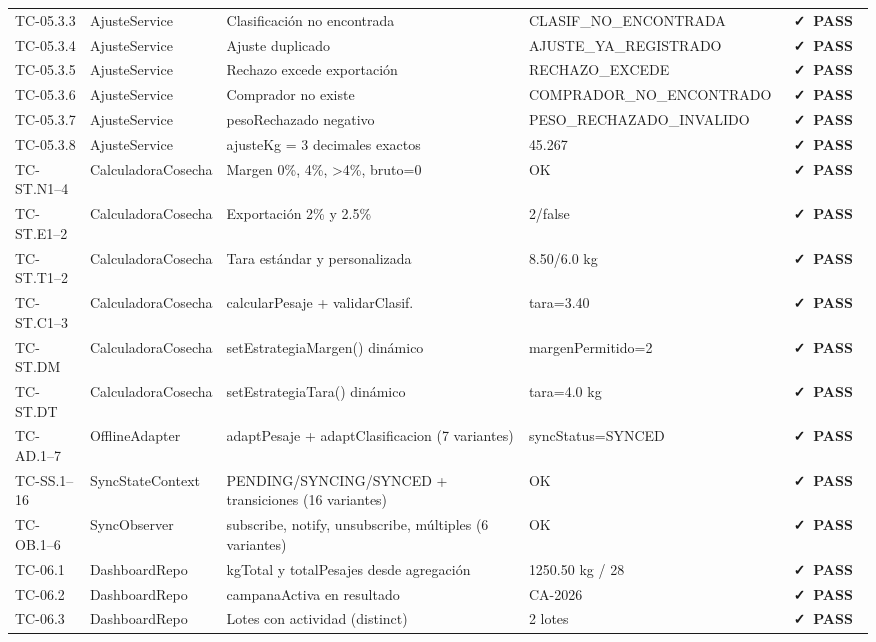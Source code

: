 \documentclass[12pt, a4paper]{article}
\newcommand{\badgePass}{\colorbox{CSuccessBg}{\color{CSuccess}\small\bfseries\ \faCheck\ PASS\ }}
\begin{document}
\begin{longtable}{>{\ttfamily}p{2.1cm} p{2.5cm} p{5.0cm} p{2.5cm} >{\centering\arraybackslash}p{0.9cm}}
  TC-05.3.3 & AjusteService & Clasificación no encontrada & CLASIF\_NO\_ENCONTRADA & \badgePass \\
  \rowcolor{CBg}
  TC-05.3.4 & AjusteService & Ajuste duplicado & AJUSTE\_YA\_REGISTRADO & \badgePass \\
  TC-05.3.5 & AjusteService & Rechazo excede exportación & RECHAZO\_EXCEDE & \badgePass \\
  \rowcolor{CBg}
  TC-05.3.6 & AjusteService & Comprador no existe & COMPRADOR\_NO\_ENCONTRADO & \badgePass \\
  TC-05.3.7 & AjusteService & pesoRechazado negativo & PESO\_RECHAZADO\_INVALIDO & \badgePass \\
  \rowcolor{CBg}
  TC-05.3.8 & AjusteService & ajusteKg = 3 decimales exactos & 45.267 & \badgePass \\
  \midrule
  TC-ST.N1--4 & CalculadoraCosecha & Margen 0\%, 4\%, \textgreater4\%, bruto=0 & OK & \badgePass \\
  \rowcolor{CBg}
  TC-ST.E1--2 & CalculadoraCosecha & Exportación 2\% y 2.5\% & 2/false & \badgePass \\
  TC-ST.T1--2 & CalculadoraCosecha & Tara estándar y personalizada & 8.50/6.0 kg & \badgePass \\
  \rowcolor{CBg}
  TC-ST.C1--3 & CalculadoraCosecha & calcularPesaje + validarClasif. & tara=3.40 & \badgePass \\
  TC-ST.DM & CalculadoraCosecha & setEstrategiaMargen() dinámico & margenPermitido=2 & \badgePass \\
  \rowcolor{CBg}
  TC-ST.DT & CalculadoraCosecha & setEstrategiaTara() dinámico & tara=4.0 kg & \badgePass \\
  \midrule
  TC-AD.1--7 & OfflineAdapter & adaptPesaje + adaptClasificacion (7 variantes) & syncStatus=SYNCED & \badgePass \\
  \midrule
  TC-SS.1--16 & SyncStateContext & PENDING/SYNCING/SYNCED + transiciones (16 variantes) & OK & \badgePass \\
  \midrule
  TC-OB.1--6 & SyncObserver & subscribe, notify, unsubscribe, múltiples (6 variantes) & OK & \badgePass \\
  \midrule
  TC-06.1 & DashboardRepo & kgTotal y totalPesajes desde agregación & 1250.50 kg / 28 & \badgePass \\
  \rowcolor{CBg}
  TC-06.2 & DashboardRepo & campanaActiva en resultado & CA-2026 & \badgePass \\
  TC-06.3 & DashboardRepo & Lotes con actividad (distinct) & 2 lotes & \badgePass \\

\end{longtable}
\end{document}
